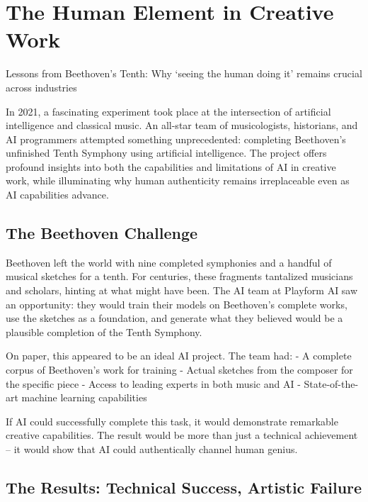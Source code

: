 \documentclass[
  Letterpaper,
]{scrbook}
\begin{document}

\chapter{The Human Element in Creative
Work}\label{the-human-element-in-creative-work}

Lessons from Beethoven's Tenth: Why `seeing the human doing it' remains
crucial across industries

\hfill\break

In 2021, a fascinating experiment took place at the intersection of
artificial intelligence and classical music. An all-star team of
musicologists, historians, and AI programmers attempted something
unprecedented: completing Beethoven's unfinished Tenth Symphony using
artificial intelligence. The project offers profound insights into both
the capabilities and limitations of AI in creative work, while
illuminating why human authenticity remains irreplaceable even as AI
capabilities advance.

\section{The Beethoven Challenge}\label{the-beethoven-challenge}

Beethoven left the world with nine completed symphonies and a handful of
musical sketches for a tenth. For centuries, these fragments tantalized
musicians and scholars, hinting at what might have been. The AI team at
Playform AI saw an opportunity: they would train their models on
Beethoven's complete works, use the sketches as a foundation, and
generate what they believed would be a plausible completion of the Tenth
Symphony.

On paper, this appeared to be an ideal AI project. The team had: - A
complete corpus of Beethoven's work for training - Actual sketches from
the composer for the specific piece - Access to leading experts in both
music and AI - State-of-the-art machine learning capabilities

If AI could successfully complete this task, it would demonstrate
remarkable creative capabilities. The result would be more than just a
technical achievement -- it would show that AI could authentically
channel human genius.

\section{The Results: Technical Success, Artistic
Failure}\label{the-results-technical-success-artistic-failure}
\end{document}

